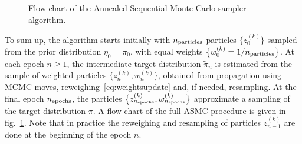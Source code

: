 \documentclass[11pt,a4paper]{article}
\begin{document}
\begin{figure}[h!]
\begin{minipage}{15cm}
\begin{tcolorbox}
				\end{tcolorbox}
			\end{minipage}
			\caption{Flow chart of the Annealed Sequential Monte Carlo sampler algorithm.}
			\label{ASMCflowchart}
		\end{figure}

	To sum up, the algorithm starts initially with $n_{\rm particles}$ particles $\big\{z^{(k)}_{0}\big\}$ sampled from the prior distribution $\eta_{0}=\pi_{0}$, with equal weights $\big\{w^{(k)}_{0} = 1/n_{\rm particles}\big\}$. At each epoch $n\geq1$, the intermediate target distribution $\tilde{\pi}_{n}$ is estimated from the sample of weighted particles $\big\{z^{(k)}_{n}, w^{(k)}_{n}\big\}$, obtained from propagation using MCMC moves, reweighing~\eqref{eq:weightsupdate} and, if needed, resampling. At the final epoch $n_{\rm epochs}$, the particles $\big\{z^{(k)}_{n_{\rm epochs}}, w^{(k)}_{n_{\rm epochs}}\big\}$ approximate a sampling of the target distribution $\pi$. A flow chart of the full ASMC procedure is given in fig.~\ref{ASMCflowchart}. Note that in practice the reweighing and resampling of particles $z_{n-1}^{(k)}$ are done at the beginning of the epoch $n$.
\end{document}
